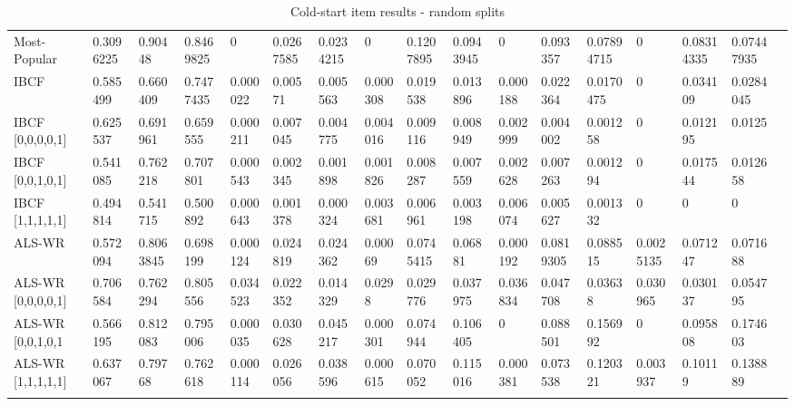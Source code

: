 \begin{table}[H]
{\begin{tabular}{*{17}{l}}
\rowcolor{Gray}
Most-Popular		& 0.3096225 & 0.90448 & 0.8469825 & 0 & 0.0267585 & 0.0234215 & 0 & 0.1207895 & 0.0943945 & 0 & 0.093357 & 0.07894715 & 0 & 0.08314335 & 	0.07447935 & \\
\rowcolor{Gray}
IBCF				& 0.585499 & 0.660409 & 0.7477435 & 0.000022 & 0.00571 & 0.005563 & 0.000308 & 0.019538 & 0.013896 & 0.000188 & 0.022364 & 0.0170475 & 0 & 0.034109 & 0.0284045 & \\
IBCF [0,0,0,0,1] 	&	0.625537	&	0.691961	&	0.659555	&	0.000211	&	0.007045	&	0.004775	&	0.004016	&	0.009116	&	0.008949	&	0.002999	&	0.004002	&	0.001258	&	0	&	0.012195	&	0.0125	& \\
IBCF [0,0,1,0,1] 	& 0.541085	&	0.762218	&	0.707801	&	0.000543	&	0.002345	&	0.001898	&	0.001826	&	0.008287	&	0.007559	&	0.002628	&	0.007263	&	0.001294	&	0	&	0.017544	&	0.012658	& \\
IBCF [1,1,1,1,1]	 &	0.494814	&	0.541715	&	0.500892	&	0.000643	&	0.001378	&	0.000324	&	0.003681	&	0.006961	&	0.003198	&	0.006074	&	0.005627	&	0.001332	&	0	&	0	&	0	& \\
\rowcolor{Gray}
ALS-WR 				&	0.572094& 0.8063845	& 0.698199	& 0.000124	&	0.024819	&	0.024362	&	0.00069	&	0.0745415	&	0.06881	&	0.000192	&	0.0819305	&	0.088515	&	0.0025135	&	0.071247	&	0.071688	& \\
ALS-WR [0,0,0,0,1] &	0.706584	&	0.762294	&	0.805556	&	0.034523	&	0.022352	&	0.014329	&	0.0298	&	0.029776	&	0.037975	&	0.036834	&	0.047708	&	0.03638	&	0.030965	&	0.030137	&	0.054795	&\\
ALS-WR [0,0,1,0,1&	0.566195	&	0.812083	&	0.795006	&	0.000035	&	0.030628	&	0.045217	&	0.000301	&	0.074944	&	0.106405	&	0	&	0.088501	&	0.156992	&	0	&	0.095808	&	0.174603	& \\
ALS-WR [1,1,1,1,1]	& 0.637067	&	0.79768	&	0.762618	&	0.000114	&	0.026056	&	0.038596	&	0.000615	&	0.070052	&	0.115016	&	0.000381	&	0.073538	&	0.120321	&	0.003937	&	0.10119	&	0.138889	& \\ \\

\bottomrule
\end{tabular}
}
\caption{Cold-start item results - random splits}
\end{table}


